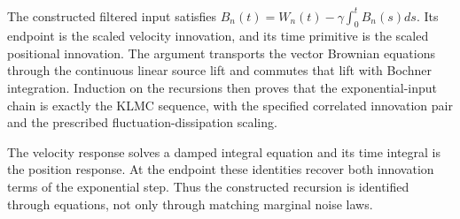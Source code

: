 \documentclass[11pt,a4paper]{article}
\begin{document}
The constructed filtered input satisfies \(B_n(t)=W_n(t)-\gamma\int_0^tB_n(s)ds\). Its endpoint is the scaled velocity innovation, and its time primitive is the scaled positional innovation. The argument transports the vector Brownian equations through the continuous linear source lift and commutes that lift with Bochner integration. Induction on the recursions then proves that the exponential-input chain is exactly the KLMC sequence, with the specified correlated innovation pair and the prescribed fluctuation-dissipation scaling.



The velocity response solves a damped integral equation and its time integral is the position response. At the endpoint these identities recover both innovation terms of the exponential step. Thus the constructed recursion is identified through equations, not only through matching marginal noise laws.
\end{document}
